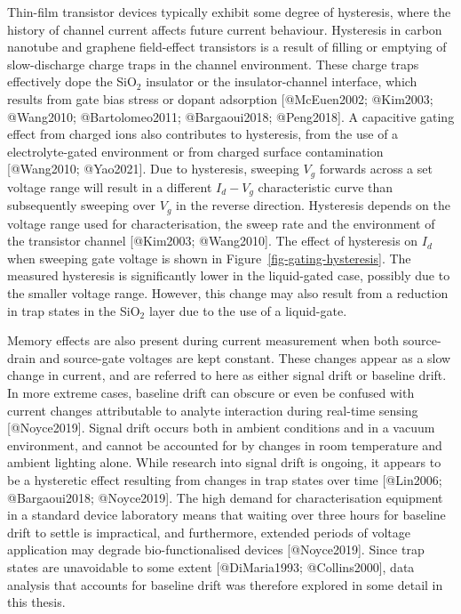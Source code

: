 \documentclass[
  letterpaper,
  DIV=11,
  numbers=noendperiod]{scrartcl}
\begin{document}
Thin-film transistor devices typically exhibit some degree of
hysteresis, where the history of channel current affects future current
behaviour. Hysteresis in carbon nanotube and graphene field-effect
transistors is a result of filling or emptying of slow-discharge charge
traps in the channel environment. These charge traps effectively dope
the SiO\(_2\) insulator or the insulator-channel interface, which
results from gate bias stress or dopant adsorption {[}@McEuen2002;
@Kim2003; @Wang2010; @Bartolomeo2011; @Bargaoui2018; @Peng2018{]}. A
capacitive gating effect from charged ions also contributes to
hysteresis, from the use of a electrolyte-gated environment or from
charged surface contamination {[}@Wang2010; @Yao2021{]}. Due to
hysteresis, sweeping \(V_g\) forwards across a set voltage range will
result in a different \(I_d - V_g\) characteristic curve than
subsequently sweeping over \(V_g\) in the reverse direction. Hysteresis
depends on the voltage range used for characterisation, the sweep rate
and the environment of the transistor channel {[}@Kim2003; @Wang2010{]}.
The effect of hysteresis on \(I_d\) when sweeping gate voltage is shown
in Figure~\ref{fig-gating-hysteresis}. The measured hysteresis is
significantly lower in the liquid-gated case, possibly due to the
smaller voltage range. However, this change may also result from a
reduction in trap states in the SiO\(_2\) layer due to the use of a
liquid-gate.

Memory effects are also present during current measurement when both
source-drain and source-gate voltages are kept constant. These changes
appear as a slow change in current, and are referred to here as either
signal drift or baseline drift. In more extreme cases, baseline drift
can obscure or even be confused with current changes attributable to
analyte interaction during real-time sensing {[}@Noyce2019{]}. Signal
drift occurs both in ambient conditions and in a vacuum environment, and
cannot be accounted for by changes in room temperature and ambient
lighting alone. While research into signal drift is ongoing, it appears
to be a hysteretic effect resulting from changes in trap states over
time {[}@Lin2006; @Bargaoui2018; @Noyce2019{]}. The high demand for
characterisation equipment in a standard device laboratory means that
waiting over three hours for baseline drift to settle is impractical,
and furthermore, extended periods of voltage application may degrade
bio-functionalised devices {[}@Noyce2019{]}. Since trap states are
unavoidable to some extent {[}@DiMaria1993; @Collins2000{]}, data
analysis that accounts for baseline drift was therefore explored in some
detail in this thesis.
\end{document}

